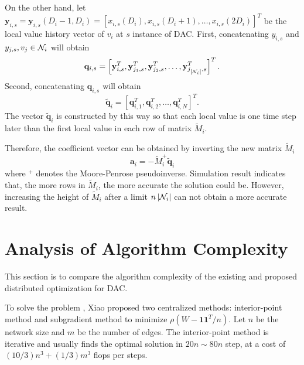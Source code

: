 On the other hand, let $\mathbf{y}_{i,s}=\mathbf{y}_{i,s}\left(D_{i}-1,D_{i}\right)=\left[x_{i,s}\left(D_{i}\right),x_{i,s}\left(D_{i}+1\right),\dots,x_{i,s}\left(2D_{i}\right)\right]^{T}$
be the local value history vector of $v_{i}$ at $s$ instance of
DAC. First, concatenating $y_{i,s}$ and $y_{j,s},v_{j}\in{\cal N}_{i}$
will obtain
\begin{equation}
\mathbf{q}_{i,s}=\left[\mathbf{y}_{i,s}^{T},\mathbf{y}_{j_{1},s}^{T},\mathbf{y}_{j_{2},s}^{T},\ldots,\mathbf{y}_{j_{\left|{\cal N}_{i}\right|},s}^{T}\right]^{T}.
\end{equation}
Second, concatenating $\mathbf{q}_{i,s}$ will obtain
\begin{equation}
\tilde{\mathbf{q}}_{i}=\left[\mathbf{q}_{i,1}^{T},\mathbf{q}_{i,2}^{T},\ldots,\mathbf{q}_{i,N}^{T}\right]^{T}.
\end{equation}
The vector $\tilde{\mathbf{q}}_{i}$ is constructed by this way so
that each  local value is one time step later than the first  local
value in each row of matrix $\tilde{M}_{i}$. 

Therefore, the coefficient vector can be obtained by inverting the
new  matrix $\tilde{M}_{i}$
\begin{equation}
\mathbf{a}_{i}=-\tilde{M}_{i}^{+}\tilde{\mathbf{q}}_{i}\label{eq:expanded Toeplitz Eq.}
\end{equation}
where $^{+}$ denotes the Moore-Penrose pseudoinverse. Simulation
result indicates that,  the more rows in $\tilde{M}_{i}$, the more
accurate the solution could be. However, increasing the height of
$\tilde{M}_{i}$ after a  limit $n\left|{\cal N}_{i}\right|$ can
not obtain a more accurate result. 


\section{\label{sec:Algorithm-Complexity}Analysis of Algorithm Complexity}

This section is to compare the algorithm complexity of the existing
and proposed distributed optimization  for DAC. 

To solve the problem , Xiao \cite{Xiao2004}
proposed two centralized methods: interior-point method and subgradient
method to minimize $\rho\left(W-\mathbf{11}^{T}/n\right)$. Let $n$
be the network size and $m$ be the number of edges. The interior-point
method is iterative and usually finds the optimal solution in $20n\sim80n$
step, at a cost of $(10/3)n^{3}+(1/3)m^{3}$ flops per steps. 

